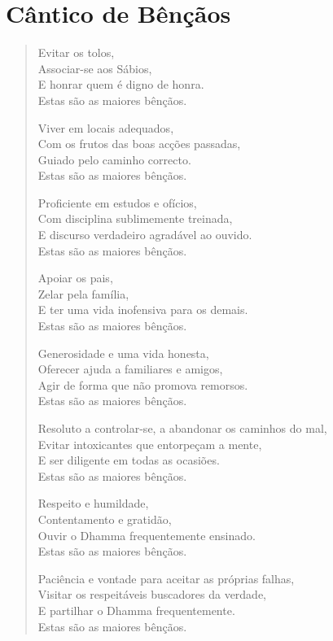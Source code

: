 \cleartoverso
\chapter{Cântico de Bênçãos}

\vspace*{-\baselineskip}

\begin{verse}

Evitar os tolos,\\
Associar-se aos Sábios,\\
E honrar quem é digno de honra.\\
Estas são as maiores bênçãos.

Viver em locais adequados,\\
Com os frutos das boas acções passadas,\\
Guiado pelo caminho correcto.\\
Estas são as maiores bênçãos.

Proficiente em estudos e ofícios,\\
Com disciplina sublimemente treinada,\\
E discurso verdadeiro agradável ao ouvido.\\
Estas são as maiores bênçãos.

Apoiar os pais,\\
Zelar pela família,\\
E ter uma vida inofensiva para os demais.\\
Estas são as maiores bênçãos.

Generosidade e uma vida honesta,\\
Oferecer ajuda a familiares e amigos,\\
Agir de forma que não promova remorsos.\\
Estas são as maiores bênçãos.

Resoluto a controlar-se, a abandonar os caminhos do mal,\\
Evitar intoxicantes que entorpeçam a mente,\\
E ser diligente em todas as ocasiões.\\
Estas são as maiores bênçãos.

Respeito e humildade,\\
Contentamento e gratidão,\\
Ouvir o Dhamma frequentemente ensinado.\\
Estas são as maiores bênçãos.

Paciência e vontade para aceitar as próprias falhas,\\
Visitar os respeitáveis buscadores da verdade,\\
E partilhar o Dhamma frequentemente.\\
Estas são as maiores bênçãos.


\end{verse}
